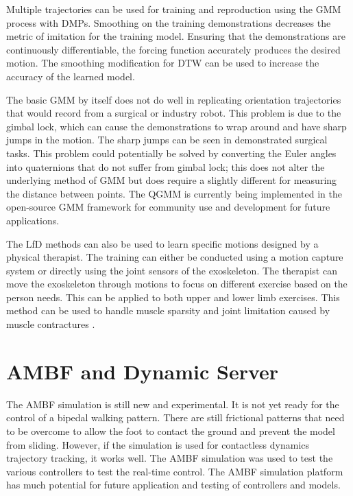 Multiple trajectories can be used for training and reproduction using the GMM process with DMPs. Smoothing on the training demonstrations decreases the metric of imitation for the training model. Ensuring that the demonstrations are continuously differentiable, the forcing function accurately produces the desired motion. The smoothing modification for DTW can be used to increase the accuracy of the learned model. 

The basic GMM by itself does not do well in replicating orientation trajectories that would record from a surgical or industry robot. This problem is due to the gimbal lock, which can cause the demonstrations to wrap around and have sharp jumps in the motion. The sharp jumps can be seen in demonstrated surgical tasks. This problem could potentially be solved by converting the Euler angles into quaternions that do not suffer from gimbal lock; this does not alter the underlying method of GMM but does require a slightly different for measuring the distance between points. The QGMM is currently being implemented in the open-source GMM framework for community use and development for future applications. 

The LfD methods can also be used to learn specific motions designed by a physical therapist. The training can either be conducted using a motion capture system or directly using the joint sensors of the exoskeleton. The therapist can move the exoskeleton through motions to focus on different exercise based on the person needs. This can be applied to both upper and lower limb exercises. This method can be used to handle muscle sparsity and joint limitation caused by muscle contractures   \cite{hayes2014neuromuscular,james2001contractures}. 

\section{AMBF and Dynamic Server}


The AMBF simulation is still new and experimental. It is not yet ready for the control of a bipedal walking pattern. There are still frictional patterns that need to be overcome to allow the foot to contact the ground and prevent the model from sliding. However, if the simulation is used for contactless dynamics trajectory tracking, it works well. The AMBF simulation was used to test the various controllers to test the real-time control. The AMBF simulation platform has much potential for future application and testing of controllers and models. 

